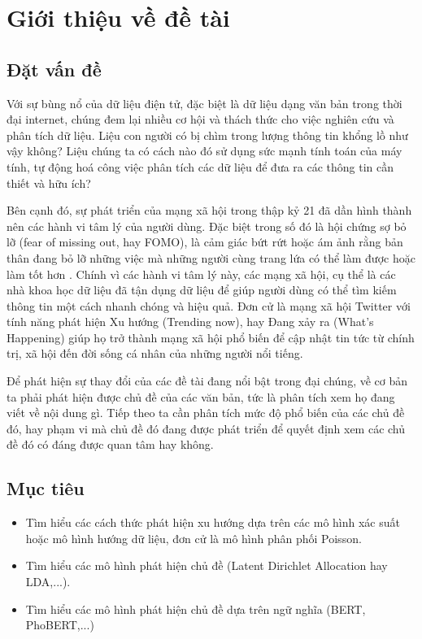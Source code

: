 \documentclass[11pt, a4paper]{article}
\begin{document}
\newpage
\tableofcontents
\newpage

\section{Giới thiệu về đề tài}
\label{sec:introduction}

\subsection{Đặt vấn đề}
Với sự bùng nổ của dữ liệu điện tử, đặc biệt là dữ liệu dạng văn bản trong thời
đại internet, chúng đem lại nhiều cơ hội và thách thức cho việc nghiên cứu và
phân tích dữ liệu. Liệu con người có bị chìm trong lượng thông tin khổng lồ như
vậy không? Liệu chúng ta có cách nào đó sử dụng sức mạnh tính toán của máy
tính, tự động hoá công việc phân tích các dữ liệu để đưa ra các thông tin cần
thiết và hữu ích?

Bên cạnh đó, sự phát triển của mạng xã hội trong thập kỷ 21 đã dần hình thành
nên các hành vi tâm lý của người dùng. Đặc biệt trong số đó là hội chứng sợ bỏ
lỡ (fear of missing out, hay FOMO), là cảm giác bứt rứt hoặc ám ảnh rằng bản
thân đang bỏ lỡ những việc mà những người cùng trang lứa có thể làm được hoặc
làm tốt hơn \cite{jwtintelligence_fear_2015}. Chính vì các hành vi tâm lý này,
các mạng xã hội, cụ thể là các nhà khoa học dữ liệu đã tận dụng dữ liệu để giúp
người dùng có thể tìm kiếm thông tin một cách nhanh chóng và hiệu quả. Đơn cử
là mạng xã hội Twitter với tính năng phát hiện Xu hướng (Trending now), hay
Đang xảy ra (What's Happening) giúp họ trở thành mạng xã hội phổ biến để cập
nhật tin tức từ chính trị, xã hội đến đời sống cá nhân của những người nổi
tiếng.

Để phát hiện sự thay đổi của các đề tài đang nổi bật trong đại chúng, về cơ bản
ta phải phát hiện được chủ đề của các văn bản, tức là phân tích xem họ đang
viết về nội dung gì.  Tiếp theo ta cần phân tích mức độ phổ biến của các chủ đề
đó, hay phạm vi mà chủ đề đó đang được phát triển để quyết định xem các chủ đề
đó có đáng được quan tâm hay không.

\subsection{Mục tiêu}
\begin{itemize}
	\item Tìm hiểu các cách thức phát hiện xu hướng dựa trên các mô hình xác
		suất hoặc mô hình hướng dữ liệu, đơn cử là mô hình phân phối Poisson.

	\item Tìm hiểu các mô hình phát hiện chủ đề (Latent Dirichlet Allocation
		hay LDA,...).

	\item Tìm hiểu các mô hình phát hiện chủ đề dựa trên ngữ nghĩa (BERT,
		PhoBERT,...)
\end{itemize}
\end{document}
